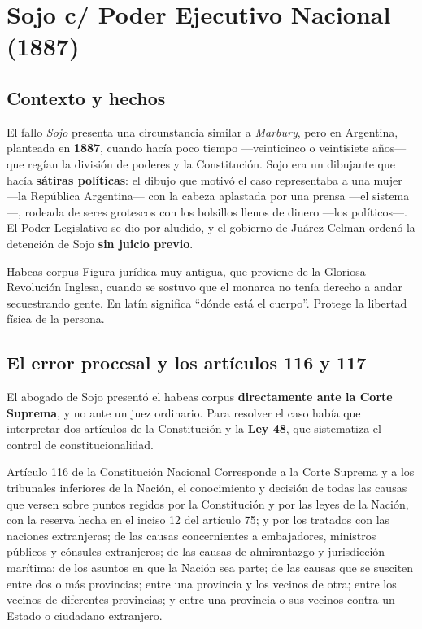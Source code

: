 \documentclass[12pt,oneside]{book}
\begin{document}
\section{Sojo c/ Poder Ejecutivo Nacional (1887)}

\subsection{Contexto y hechos}

El fallo \emph{Sojo} presenta una circunstancia similar a \emph{Marbury}, pero en Argentina, planteada en \textbf{1887}, cuando hacía poco tiempo ---veinticinco o veintisiete años--- que regían la división de poderes y la Constitución. Sojo era un dibujante que hacía \textbf{sátiras políticas}: el dibujo que motivó el caso representaba a una mujer ---la República Argentina--- con la cabeza aplastada por una prensa ---el sistema---, rodeada de seres grotescos con los bolsillos llenos de dinero ---los políticos---. El Poder Legislativo se dio por aludido, y el gobierno de Juárez Celman ordenó la detención de Sojo \textbf{sin juicio previo}.

\begin{definition}{Habeas corpus}
Figura jurídica muy antigua, que proviene de la Gloriosa Revolución Inglesa, cuando se sostuvo que el monarca no tenía derecho a andar secuestrando gente. En latín significa ``dónde está el cuerpo''. Protege la libertad física de la persona.
\end{definition}

\subsection{El error procesal y los artículos 116 y 117}

El abogado de Sojo presentó el habeas corpus \textbf{directamente ante la Corte Suprema}, y no ante un juez ordinario. Para resolver el caso había que interpretar dos artículos de la Constitución y la \textbf{Ley 48}, que sistematiza el control de constitucionalidad.

\begin{norma}{Artículo 116 de la Constitución Nacional}
Corresponde a la Corte Suprema y a los tribunales inferiores de la Nación, el conocimiento y decisión de todas las causas que versen sobre puntos regidos por la Constitución y por las leyes de la Nación, con la reserva hecha en el inciso 12 del artículo 75; y por los tratados con las naciones extranjeras; de las causas concernientes a embajadores, ministros públicos y cónsules extranjeros; de las causas de almirantazgo y jurisdicción marítima; de los asuntos en que la Nación sea parte; de las causas que se susciten entre dos o más provincias; entre una provincia y los vecinos de otra; entre los vecinos de diferentes provincias; y entre una provincia o sus vecinos contra un Estado o ciudadano extranjero.
\end{norma}
\end{document}

